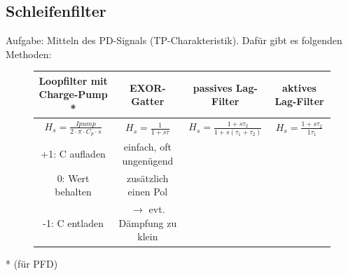 \subsection{Schleifenfilter}
Aufgabe: Mitteln des PD-Signals (TP-Charakteristik). Dafür gibt es folgenden Methoden:
\begin{figure}[h!]
\begin{minipage}{0.1\textwidth}
        \begin{tabular}{|c|c|c|c|}
          \hline
          Loopfilter mit Charge-Pump *                            & EXOR-Gatter                       & passives Lag-Filter                                   & aktives Lag-Filter\\
          \hline \hline
          $H_{s}=\frac{I{pump}}{2 \cdot \pi \cdot C_p \cdot s}$   & $H_{s}=\frac{1}{1+s\tau}$         & $H_{s}=\frac{1+s\tau _2}{1+s(\tau _1 +\tau _2)}$      & $H_{s}=\frac{1+s\tau _2}{1\tau _1 }$  \\
          \hline
          +1: C aufladen                                          & einfach, oft ungenügend           &                                                       &\\    
          0: Wert behalten                                        & zusätzlich einen Pol              &                                                       & \\
          -1: C entladen                                          & $\to$ evt. Dämpfung zu klein      &                                                       &  \\
          \hline
        \end{tabular}
	\end{minipage}
\end{figure}
\FloatBarrier
* (für PFD) 

\FloatBarrier

